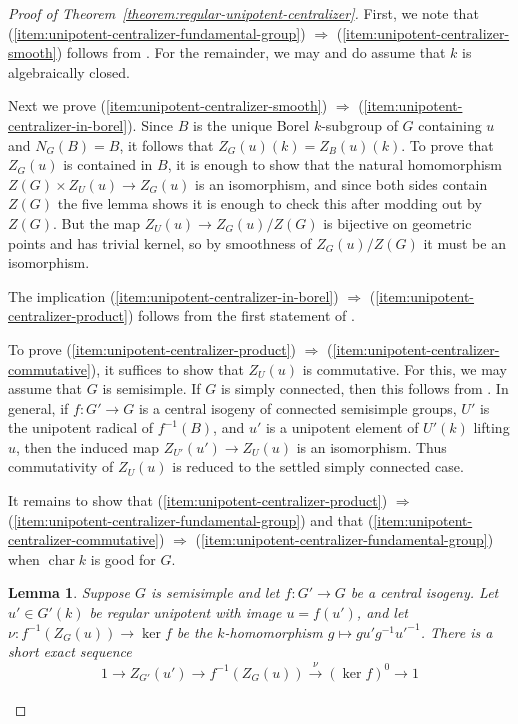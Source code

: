 \documentclass[11pt,reqno]{amsart}
\newtheorem{lemma}[theorem]{Lemma}
\theoremstyle{definition}
\DeclareMathOperator{\chara}{char}
\begin{document}
\begin{proof}[Proof of Theorem~\ref{theorem:regular-unipotent-centralizer}]
First, we note that (\ref{item:unipotent-centralizer-fundamental-group}) $\Rightarrow$ (\ref{item:unipotent-centralizer-smooth}) follows from \cite[Lemma 3.4]{Integral-Springer}. For the remainder, we may and do assume that $k$ is algebraically closed. 

Next we prove (\ref{item:unipotent-centralizer-smooth}) $\Rightarrow$ (\ref{item:unipotent-centralizer-in-borel}). Since $B$ is the unique Borel $k$-subgroup of $G$ containing $u$ and $N_G(B) = B$, it follows that $Z_G(u)(k) = Z_B(u)(k)$. To prove that $Z_G(u)$ is contained in $B$, it is enough to show that the natural homomorphism $Z(G) \times Z_U(u) \to Z_G(u)$ is an isomorphism, and since both sides contain $Z(G)$ the five lemma shows it is enough to check this after modding out by $Z(G)$. But the map $Z_U(u) \to Z_G(u)/Z(G)$ is bijective on geometric points and has trivial kernel, so by smoothness of $Z_G(u)/Z(G)$ it must be an isomorphism.

The implication (\ref{item:unipotent-centralizer-in-borel}) $\Rightarrow$ (\ref{item:unipotent-centralizer-product}) follows from the first statement of \cite[Lemma 3.4]{Integral-Springer}. 

To prove (\ref{item:unipotent-centralizer-product}) $\Rightarrow$ (\ref{item:unipotent-centralizer-commutative}), it suffices to show that $Z_U(u)$ is commutative. For this, we may assume that $G$ is semisimple. If $G$ is simply connected, then this follows from \cite[Corollary 3.11]{Integral-Springer}. In general, if $f: G' \to G$ is a central isogeny of connected semisimple groups, $U'$ is the unipotent radical of $f^{-1}(B)$, and $u'$ is a unipotent element of $U'(k)$ lifting $u$, then the induced map $Z_{U'}(u') \to Z_U(u)$ is an isomorphism. Thus commutativity of $Z_U(u)$ is reduced to the settled simply connected case. 

It remains to show that (\ref{item:unipotent-centralizer-product}) $\Rightarrow$ (\ref{item:unipotent-centralizer-fundamental-group}) and that (\ref{item:unipotent-centralizer-commutative}) $\Rightarrow$ (\ref{item:unipotent-centralizer-fundamental-group}) when $\chara k$ is good for $G$.

\begin{lemma}\label{lemma:centralizer-kernel-smooth}
Suppose $G$ is semisimple and let $f: G' \to G$ be a central isogeny. Let $u' \in G'(k)$ be regular unipotent with image $u = f(u')$, and let $\nu\colon f^{-1}(Z_G(u)) \to \ker f$ be the $k$-homomorphism $g \mapsto gu'g^{-1}u'^{-1}$. There is a short exact sequence
\[
1 \to Z_{G'}(u') \to f^{-1}(Z_G(u)) \xrightarrow[]{\nu} (\ker f)^0 \to 1
\]
\end{lemma}


\end{proof}
\end{document}
